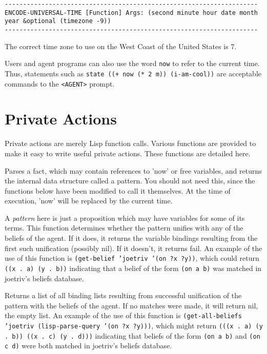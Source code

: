 \begin{verbatim}
---------------------------------------------------------------------
ENCODE-UNIVERSAL-TIME [Function] Args: (second minute hour date month
year &optional (timezone -9))
---------------------------------------------------------------------
\end{verbatim}

The correct time zone to use on the West Coast of the United States is
7.

Users and agent programs can also use the word {\tt now} to refer to
the current time.  Thus, statements such as {\tt state ((+ now (* 2
m)) (i-am-cool))} are acceptable commands to the {\tt <AGENT>} prompt.


\section{Private Actions}

Private actions are merely Lisp function calls.  Various functions are
provided to make it easy to write useful private actions.  These
functions are detailed here.

Parses a fact, which may contain references to 'now' or free
variables, and returns the internal data structure called a pattern.
You should not need this, since the functions below have been modified
to call it themselves.  At the time of execution, 'now' will be
replaced by the current time.

A {\em pattern\/} here is just a proposition which may have variables
for some of its terms.  This function determines whether the pattern
unifies with any of the beliefs of the agent.  If it does, it returns
the variable bindings resulting from the first such unification
(possibly nil).  If it doesn't, it returns fail.  An example of the
use of this function is {\tt (get-belief 'joetriv '(on ?x ?y))}, which
could return {\tt ((x . a) (y . b))} indicating that a belief of the
form {\tt (on a b)} was matched in joetriv's beliefs database.

Returns a list of all binding lists resulting from successful
unification of the pattern with the beliefs of the agent.  If no
matches were made, it will return nil, the empty list.  An example of
the use of this function is {\tt (get-all-beliefs 'joetriv
(lisp-parse-query '(on ?x ?y)))}, which might return {\tt (((x . a) (y
. b)) ((x . c) (y . d)))} indicating that beliefs of the form {\tt (on
a b)} and {\tt (on c d)} were both matched in joetriv's beliefs
database.

